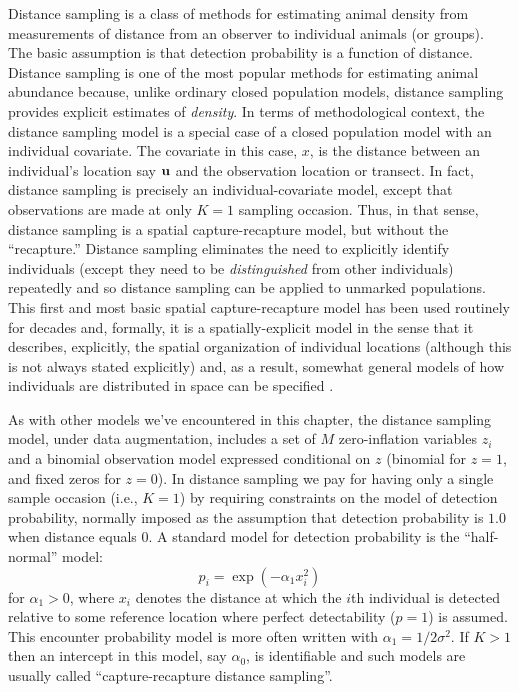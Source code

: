 Distance sampling is a class of methods for estimating animal density
from measurements of distance from an observer to individual animals
(or groups). The basic assumption is that detection probability is
 a function of distance.
Distance sampling is one of the most popular methods for estimating
animal abundance \citep{burnham_etal:1980, buckland_etal:2001,
  buckland_etal:2004book} because, unlike ordinary closed population models,
distance sampling provides explicit estimates of {\it density}.
 In terms of
methodological context, the distance sampling model is a special case
of a closed population model with an individual covariate. The
covariate in this case, $x$, is the distance between an
individual's location say ${\bf u}$ and the observation location or transect. In
fact, distance sampling is precisely an
individual-covariate model, except
that observations are made at only $K=1$ sampling occasion. Thus, in
that sense, distance sampling is a spatial capture-recapture model,
but without the ``recapture.''  Distance sampling  eliminates the need to
explicitly identify individuals (except they need to be {\it
  distinguished} from other individuals) repeatedly and so distance
sampling can be applied to unmarked populations.
This first and most basic spatial
capture-recapture model has been used routinely for decades and,
formally, it is a spatially-explicit model in the sense that it
describes, explicitly, the spatial organization of individual
locations (although this is not always stated explicitly) and, as a
result, somewhat general models of how individuals are distributed in
space can be specified \citep{hedley_etal:1999, royle_etal:2004,
  johnson_etal:2010, niemi_fernandez:2010, sillett_etal:2012}.

As with other models we've encountered in this chapter, the distance sampling model, under data augmentation,
includes a set of $M$ zero-inflation variables $z_{i}$ and a
binomial observation model expressed conditional on $z$ (binomial for $z=1$, and
fixed zeros for $z=0$).  In distance sampling we pay for having only a
single sample occasion (i.e., $K=1$) by requiring constraints on the model of
detection probability, normally imposed as the assumption that
detection probability is $1.0$ when distance equals 0.  A standard
model for detection probability is the ``half-normal'' model:
\[
p_{i} = \exp(-\alpha_{1} x_{i}^{2})
\]
for $\alpha_{1} > 0$, 
where $x_i$ denotes the distance at which the $i$th
individual is detected relative to some reference location where
perfect detectability ($p=1$) is assumed. This encounter probability
model is more often written with
$\alpha_{1} =
1/2\sigma^{2}$.  If $K>1$ then an intercept in this model, say $\alpha_{0}$, is
identifiable and such models are usually called ``capture-recapture
distance sampling''\citep{alpizar_pollock:1996,borchers_etal:1998}.

